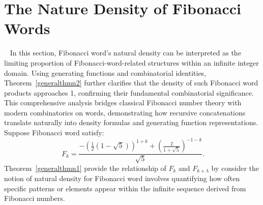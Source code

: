 \documentclass[11pt, a4paper]{article}
\theoremstyle{definition}
\begin{document}
\section{The Nature Density of Fibonacci Words}~\label{resec3}
In this section, Fibonacci word's natural density can be interpreted as the limiting proportion of Fibonacci-word-related structures within an infinite integer domain. Using generating functions and combinatorial identities, Theorem~\ref{generalthmn2} further clarifies that the density of such Fibonacci word products approaches 1, confirming their fundamental combinatorial significance. This comprehensive analysis bridges classical Fibonacci number theory with modern combinatorics on words, demonstrating how recursive concatenations translate naturally into density formulas and generating function representations. Suppose Fibonacci word satisfy:  
\begin{equation}~\label{eqqFiWo}
F_k=\frac{-\left(\frac{1}{2} \left(1-\sqrt{5}\right)\right)^{1+k}+\left(\frac{2}{1+\sqrt{5}}\right)^{-1-k}}{\sqrt{5}}.
\end{equation}
Theorem~\ref{generalthmn1} provide the relationship of $F_k$ and $F_{k+\lambda}$ by consider the notion of natural density for Fibonacci word involves quantifying how often specific patterns or elements appear within the infinite sequence derived from Fibonacci numbers.
\end{document}
